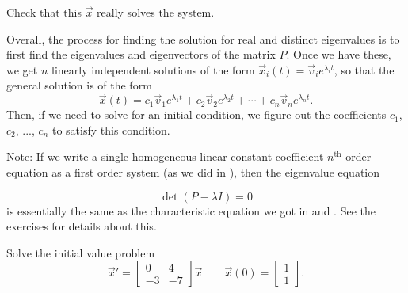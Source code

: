 \documentclass{ximera}
\begin{document}
\begin{exercise}
    Check that this $\vec{x}$ really solves the system.
\end{exercise}

Overall, the process for finding the solution for real and distinct eigenvalues is to first find the eigenvalues and eigenvectors of the matrix $P$. Once we have these, we get $n$ linearly independent solutions of the form $\vec{x}_i(t) = \vec{v}_ie^{\lambda_i t}$, so that the general solution is of the form
\[ 
    \vec{x}(t) = c_1\vec{v}_1e^{\lambda_1 t} + c_2\vec{v}_2e^{\lambda_2 t} + \cdots + c_n\vec{v}_ne^{\lambda_n t}. 
\] 
Then, if we need to solve for an initial condition, we figure out the coefficients $c_1$, $c_2$, ..., $c_n$ to satisfy this condition.

Note: If we write a single homogeneous linear constant coefficient $n^{\text{th}}$ order equation as a first order system (as we did in ), then the eigenvalue equation

\begin{equation*}
    \det(P - \lambda I) = 0
\end{equation*}
is essentially the same as the characteristic equation we got in  and . See the exercises for details about this.

\begin{example}
    Solve the initial value problem
    \begin{equation*}
        \vec{x}' = \begin{bmatrix} 0 & 4 \\ -3 & -7 \end{bmatrix}\vec{x} \qquad \vec{x}(0) = \begin{bmatrix} 1 \\ 1 \end{bmatrix}.
    \end{equation*}
\end{example}
\end{document}
